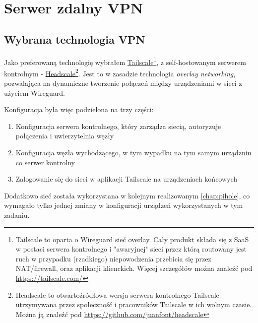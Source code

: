 \documentclass[../main.tex]{subfiles}
\begin{document}
\setcounter{chapter}{4}
\chapter{Serwer zdalny VPN}
\label{chap:vpn}
\section{Wybrana technologia VPN}
Jako preferowaną technologię wybrałem \href{https://tailscale.com}{Tailscale}\footnote{Tailscale to oparta o Wireguard sieć overlay. Cały produkt składa się z SaaS w postaci serwera kontrolnego i "awaryjnej" sieci przez którą routowany jest ruch w przypadku (rzadkiego) niepowodzenia przebicia się przez NAT/firewall, oraz aplikacji klienckich. Więcej szczegółów można znaleźć pod \url{https://tailscale.com/}}, z self-hostowanym serwerem kontrolnym - \href{https://github.com/juanfont/headscale}{Headscale}\footnote{Headscale to otwartoźródłowa wersja serwera kontrolnego Tailscale utrzymywana przez społeczność i pracowników Tailscale w ich wolnym czasie. Można ją znaleźć pod \url{https://github.com/juanfont/headscale}}. Jest to w zasadzie technologia \textit{overlay networking}, pozwalająca na dynamiczne tworzenie połączeń między urządzeniami w sieci z użyciem Wireguard.

Konfiguracja była więc podzielona na trzy części:
\begin{enumerate}
    \item Konfiguracja serwera kontrolnego, który zarządza siecią, autoryzuje połączenia i uwierzytelnia węzły
    \item Konfiguracja węzła wychodzącego, w tym wypadku na tym samym urządzniu co serwer kontrolny
    \item Zalogowanie się do sieci w aplikacji Tailscale na urządzeniach końcowych
\end{enumerate}

Dodatkowo sieć została wykorzystana w kolejnym realizowanym \autoref{chap:pihole}, co wymagało tylko jednej zmiany w konfiguracji urządzeń wykorzystanych w tym zadaniu.
\end{document}
